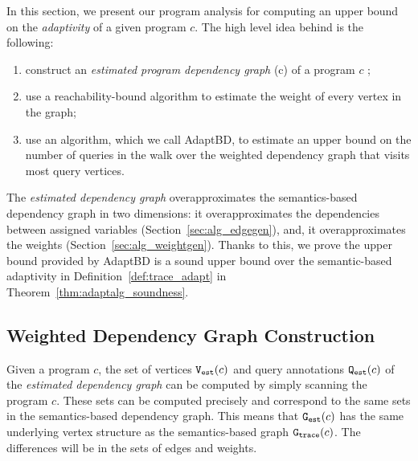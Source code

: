 In this section, we present our program analysis {\THESYSTEM} for
computing an upper bound on the \emph{adaptivity} of a given program
$c$.
%
 The high level idea behind {\THESYSTEM} is the following:
  \begin{enumerate}
    \item construct
    an \emph{estimated program dependency graph} \progG(c) of a program $c$
    ;
    \item use a reachability-bound algorithm to estimate the weight of every vertex in the graph;
    \item  use an algorithm, which we call AdaptBD, to estimate an upper bound on the number of queries in the walk over the weighted dependency graph that visits most query vertices. %
  \end{enumerate}
  The \emph{estimated dependency graph} overapproximates the
  semantics-based dependency graph in two dimensions: it
  overapproximates the dependencies between assigned variables (Section~\ref{sec:alg_edgegen}), and, it
  overapproximates the weights (Section~\ref{sec:alg_weightgen}). Thanks to this, 
 we prove the upper bound provided by AdaptBD is a sound upper bound
  over the semantic-based adaptivity in Definition~\ref{def:trace_adapt} in Theorem~\ref{thm:adaptalg_soundness}.  

%
%
\subsection{Weighted Dependency Graph Construction}
Given a program $c$, the set of vertices $\mathtt{{V_{est}}}(c)$ and query annotations $\mathtt{{Q_{est}}}(c)$ of the \emph{estimated dependency graph} can be computed by simply
scanning the program $c$. These sets can be computed precisely and correspond to
the same sets in the semantics-based dependency graph.
This means that $\mathtt{{G_{est}}}(c)$ has the same underlying vertex structure as 
the semantics-based graph $\mathtt{{G_{trace}}}(c)$. The differences will be in the sets of edges and weights. 





